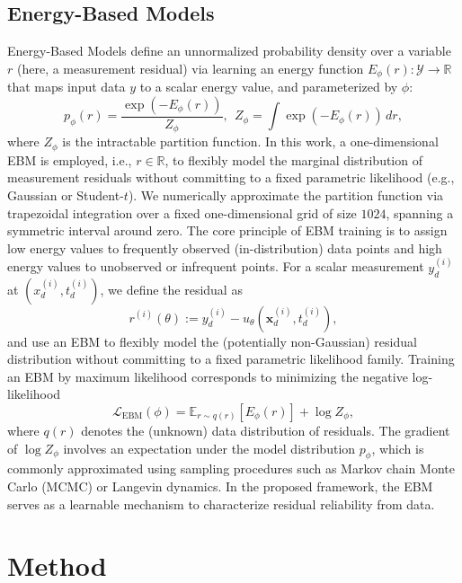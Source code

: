 \documentclass{article}
\theoremstyle{plain}
\theoremstyle{definition}
\theoremstyle{remark}
\begin{document}
\subsection{Energy-Based Models}
Energy-Based Models define an unnormalized probability density over a variable $r$ (here, a measurement residual) via learning an energy function $E_\phi(r): \mathcal{Y} \rightarrow \mathbb{R}$ that maps input data $y$ to a scalar energy value, and parameterized by $\phi$:
\begin{equation}
p_\phi(r) = \frac{\exp(-E_\phi(r))}{Z_\phi}, \ \
Z_\phi = \int \exp(-E_\phi(r))\,dr,
\label{eq:ebm_density}
\end{equation}
where $Z_\phi$ is the intractable partition function. In this work, a one-dimensional EBM is employed, i.e., $r\in\mathbb{R}$, to flexibly model the marginal distribution of measurement residuals without committing to a fixed parametric likelihood (e.g., Gaussian or Student-$t$). We numerically approximate the partition function via trapezoidal integration over a fixed one-dimensional grid of size $1024$, spanning a symmetric interval around zero. The core principle of EBM training is to assign low energy values to frequently observed (in-distribution) data points and high energy values to unobserved or infrequent points. For a scalar measurement $y_d^{(i)}$ at $(x_d^{(i)},t_d^{(i)})$, we define the residual as
\begin{equation}
r^{(i)}(\theta) := y_d^{(i)} - \hat{u}_\theta(\mathbf{x}_d^{(i)},t_d^{(i)}),
\label{eq:residual_def}
\end{equation}
and use an EBM to flexibly model the (potentially non-Gaussian) residual distribution without committing to a fixed parametric likelihood family. Training an EBM by maximum likelihood corresponds to minimizing the negative log-likelihood
\begin{equation}
\mathcal{L}_{\text{EBM}}(\phi)
= \mathbb{E}_{r \sim q(r)}\!\left[E_\phi(r)\right] + \log Z_\phi,
\label{eq:ebm_nll}
\end{equation}
where $q(r)$ denotes the (unknown) data distribution of residuals. The gradient of $\log Z_\phi$ involves an expectation under the model distribution $p_\phi$, which is commonly approximated using sampling procedures such as Markov chain Monte Carlo (MCMC) or Langevin dynamics. In the proposed framework, the EBM serves as a learnable mechanism to characterize residual reliability from data.


\section{Method}
\label{sec:method}
\end{document}
